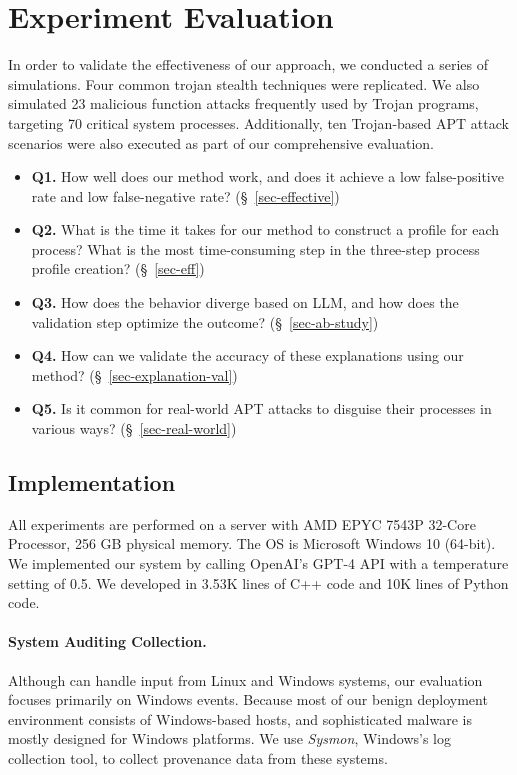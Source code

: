 \section{Experiment Evaluation}

In order to validate the effectiveness of our approach, we conducted a series of simulations. Four common trojan stealth techniques were replicated. We also simulated 23 malicious function attacks frequently used by Trojan programs, targeting 70 critical system processes. Additionally, ten Trojan-based APT attack scenarios were also executed as part of our comprehensive evaluation.

\begin{itemize}
    \item \textbf{Q1.} How well does our method work, and does it achieve a low false-positive rate and low false-negative rate? (§~\ref{sec-effective})
    \item \textbf{Q2.} What is the time it takes for our method to construct a profile for each process? What is the most time-consuming step in the three-step process profile creation? (§~\ref{sec-eff})
    \item \textbf{Q3.} How does the behavior diverge based on LLM, and how does the validation step optimize the outcome? (§~\ref{sec-ab-study})
    \item \textbf{Q4.} How can we validate the accuracy of these explanations using our method? (§~\ref{sec-explanation-val})
    \item \textbf{Q5.} Is it common for real-world APT attacks to disguise their processes in various ways? (§~\ref{sec-real-world})
\end{itemize}


\subsection{Implementation}
All experiments are performed on a server with AMD EPYC 7543P 32-Core Processor, 256 GB physical memory. The OS is Microsoft Windows 10 (64-bit).
We implemented our system by calling OpenAI's GPT-4 API with a temperature setting of 0.5.
We developed \tool in 3.53K lines of C++ code and 10K lines of Python code.

\paragraph{System Auditing Collection.}
Although \tool can handle input from Linux and Windows systems, our evaluation focuses primarily on Windows events. Because most of our benign deployment environment consists of Windows-based hosts, and sophisticated malware is mostly designed for Windows platforms.
We use \textit{Sysmon}, Windows's log collection tool, to collect provenance data from these systems.


